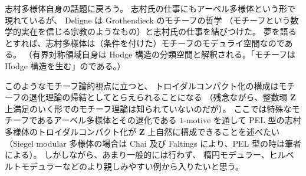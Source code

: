 \documentclass[uplatex,dvipdfmx]{jlreq}
\begin{document}
\medskip

志村多様体自身の話題に戻ろう。
志村氏の仕事にもアーベル多様体という形で現れているが、
Deligne は Grothendieck のモチーフの哲学
（モチーフという数学的実在を信じる宗教のようなもの）と志村氏の仕事を結びつけた。
夢を語るとすれば、志村多様体は（条件を付けた）モチーフのモデュライ空間なのである。
（有界対称領域自身は Hodge 構造の分類空間と解釈される。「モチーフは Hodge 構造を生む」のである。）

このようなモチーフ論的視点に立つと、
トロイダルコンパクト化の構成はモチーフの退化理論の帰結としてとらえられることになる
（残念ながら、整数環 $\mathbf{Z}$ 上満足のいく形でのモチーフ理論は知られていないのだが）。
ここでは特殊なモチーフであるアーベル多様体とその退化である $1$-motive を通して
PEL 型の志村多様体のトロイダルコンパクト化が $\mathbf{Z}$ 上自然に構成できることを述べたい
（Siegel modular 多様体の場合は Chai 及び Faltings により、PEL 型の時は筆者による）。
しかしながら、あまり一般的には行わず、
楕円モデュラー、ヒルベルトモデュラーなどのより親しみやすい例から入りたいと思う。
\end{document}
